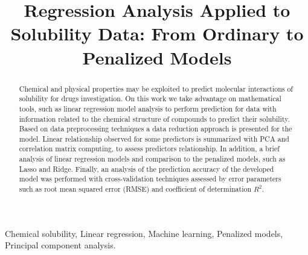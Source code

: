 \documentclass[conference]{IEEEtran}
\begin{document}
\title{Regression Analysis Applied to Solubility Data: From Ordinary to Penalized Models}

\author{
\and
{}
}

\maketitle

\begin{abstract}
Chemical and physical properties may be exploited to predict molecular interactions of solubility for drugs investigation. On this work we take advantage on mathematical tools, such as linear regression model analysis to perform prediction for data with information related to the chemical structure of compounds to predict their solubility. Based on data preprocessing techniques a data reduction approach is presented for the model. Linear relationship observed for some predictors is summarized with PCA and correlation matrix computing, to assess predictors relationship. In addition, a brief analysis of linear regression models and comparison to the penalized models, such as Lasso and Ridge. Finally, an analysis of the prediction accuracy of the developed model was performed with cross-validation techniques assessed by error parameters such as root mean squared error (RMSE) and coefficient of determination $R^{2}$.

\end{abstract}

\begin{IEEEkeywords}
Chemical solubility, Linear regression, Machine learning, Penalized models, Principal component analysis.

\end{IEEEkeywords}











\end{document}
